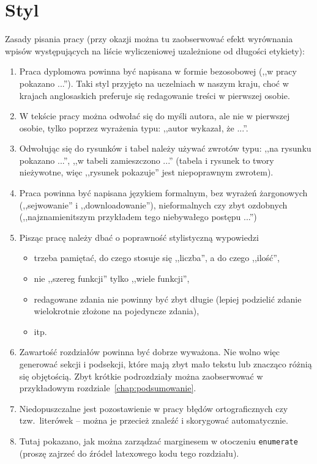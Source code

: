 \section{Styl}
\label{sec:Styl}
Zasady pisania pracy (przy okazji można tu zaobserwować efekt wyrównania wpisów występujących na liście wyliczeniowej uzależnione od długości etykiety):
\begin{enumerate}[labelwidth=\widthof{\ref{last-item}},label=\arabic*.]
\item Praca dyplomowa powinna być napisana w  formie bezosobowej (,,w pracy pokazano ...''). Taki styl przyjęto na uczelniach w naszym kraju, choć w krajach anglosaskich preferuje się redagowanie treści w pierwszej osobie.
\item W tekście pracy można odwołać się do myśli autora, ale nie w pierwszej osobie, tylko poprzez wyrażenia typu: ,,autor wykazał, że ...''. 
\item Odwołując się do rysunków i tabel należy używać zwrotów typu: ,,na rysunku pokazano ...'', ,,w tabeli zamieszczono ...'' (tabela i rysunek to twory nieżywotne, więc ,,rysunek pokazuje'' jest niepoprawnym zwrotem).
\item Praca powinna być napisana językiem formalnym, bez wyrażeń żargonowych (,,sejwowanie'' i ,,downloadowanie''), nieformalnych czy zbyt ozdobnych (,,najznamienitszym przykładem tego niebywałego postępu ...'')
\item Pisząc pracę należy dbać o poprawność stylistyczną wypowiedzi
\begin{itemize}
\item trzeba pamiętać, do czego stosuje się ,,liczba'', a do czego ,,ilość'',
\item nie ,,szereg funkcji'' tylko ,,wiele funkcji'',
\item redagowane zdania nie powinny być zbyt długie (lepiej podzielić zdanie wielokrotnie złożone na pojedyncze zdania),
\item itp.
\end{itemize}
\item Zawartość rozdziałów powinna być dobrze wyważona. Nie wolno więc generować sekcji i podsekcji, które mają zbyt mało tekstu lub znacząco różnią się objętością. Zbyt krótkie podrozdziały można zaobserwować w przykładowym rozdziale~\ref{chap:podsumowanie}.
\item Niedopuszczalne jest pozostawienie w pracy błędów ortograficznych czy tzw.\ literówek -- można je przecież znaleźć i skorygować
automatycznie. \addtocounter{enumi}{9997} 
\item  Tutaj pokazano, jak można zarządzać marginesem w otoczeniu \texttt{enumerate} (proszę zajrzeć do źródeł latexowego kodu tego rozdziału). \label{last-item}
\end{enumerate}